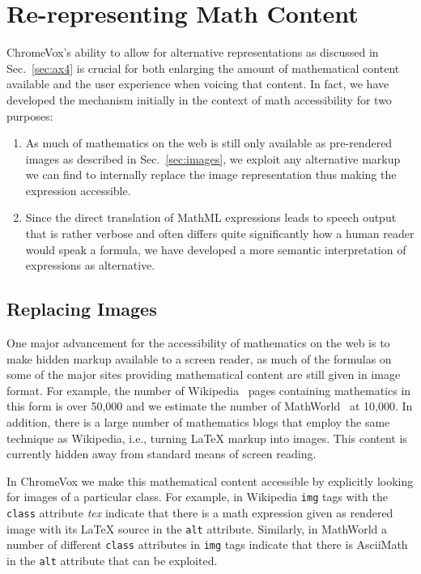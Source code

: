 \documentclass{sig-alternate}
\begin{document}
\section{Re-representing Math Content}
\label{sec:alternative}

ChromeVox's ability to allow for alternative representations as discussed in
Sec.~\ref{sec:ax4} is crucial for both enlarging the amount of mathematical content
available and the user experience when voicing that content. In fact, we have
developed the mechanism initially in the context of math accessibility for two
purposes:
\begin{enumerate}
\item As much of mathematics on the web is still only available as
  pre-rendered images as described in Sec.~\ref{sec:images}, we exploit any
  alternative markup we can find to internally replace the image representation
  thus making the expression accessible. 
\item Since the direct translation of MathML expressions leads to speech output
  that is rather verbose and often differs quite significantly how a human
  reader would speak a formula, we have developed a more semantic interpretation
  of expressions as alternative.
\end{enumerate}

\subsection{Replacing Images}
\label{sec:rep-images}

One major advancement for the accessibility of mathematics on the web is to make
hidden markup available to a screen reader, as much of the formulas on some of
the major sites providing mathematical content are still given in image format.
For example, the number of Wikipedia~\cite{wikipedia} pages containing
mathematics in this form is over 50,000 and we estimate the number of
MathWorld~\cite{mathworld} at 10,000. In addition, there is a large number of
mathematics blogs that employ the same technique as Wikipedia, i.e., turning
{\LaTeX} markup into images. This content is currently hidden away from standard
means of screen reading.

In ChromeVox we make this mathematical content accessible by explicitly looking
for images of a particular class.  For example, in Wikipedia \texttt{img} tags
with the \texttt{class} attribute \emph{tex} indicate that there is a math
expression given as rendered image with its {\LaTeX} source in the \texttt{alt}
attribute.  Similarly, in MathWorld a number of different \texttt{class}
attributes in \texttt{img} tags indicate that there is AsciiMath in the
\texttt{alt} attribute that can be exploited.
\end{document}
